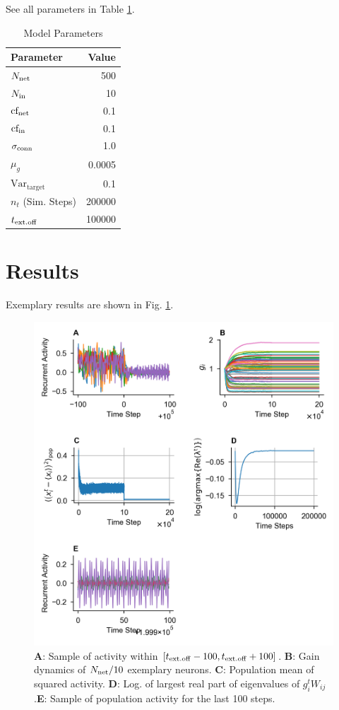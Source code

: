 \documentclass[10pt,a4paper]{article}
\begin{document}
See all parameters in Table \ref{tab:params}.
\begin{table}[h]
\caption{Model Parameters}
\centering
\vspace{5pt}
\begin{tabular}{l | r}
\textbf{Parameter} & \textbf{Value} \\
\hline
$N_{\rm net}$           & 500\\
$N_{\rm in}$            & 10\\
${\rm cf_{net}}$        & 0.1\\
${\rm cf_{in}}$         & 0.1\\
$\sigma_{\rm conn}$     & 1.0\\
$\mu_{g}$               & 0.0005\\
$\mathrm{Var_{target}}$ & 0.1\\
$n_t$ (Sim. Steps)      & 200000\\
$t_{\rm ext.off}$       & 100000
\end{tabular}
\label{tab:params}
\end{table}
\newpage
\section{Results}
Exemplary results are shown in Fig. \ref{fig:ex_results}.

\begin{figure}[h]
\includegraphics[width=\textwidth]{../plots/im_comp.png}
\caption{{\bf A}: Sample of activity within $\left[ t_{\rm ext.off} - 100, t_{\rm ext.off} + 100 \right]$. {\bf B}: Gain dynamics of $N_{\rm net}/10$ exemplary neurons. {\bf C}: Population mean of squared activity. {\bf D}: Log. of largest real part of eigenvalues of $g_i^t W_{ij} $.{\bf E}: Sample of population activity for the last 100 steps.}
\label{fig:ex_results}
\end{figure}
\end{document}
